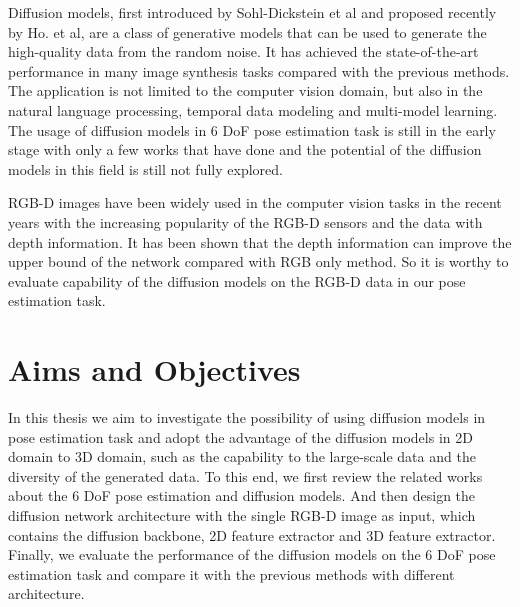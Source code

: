 \documentclass[12pt,DIV14,BCOR12mm,a4paper,footinclude=false,headinclude,parskip=half-,twoside,openright,cleardoublepage=empty,toc=index,bibliography=totoc,listof=totoc]{scrreprt}
\numberwithin{equation}{chapter}
\begin{document}
Diffusion models, first introduced by Sohl-Dickstein et al\cite{sohldickstein2015deep} and proposed recently by Ho. et al\cite{ho2020denoising}, are a class of generative models that can be used to generate the high-quality data from the random noise. It has achieved the state-of-the-art performance in many image synthesis tasks compared with the previous methods. The application is not limited to the computer vision domain, but also in the natural language processing, temporal data modeling and multi-model learning. The usage of diffusion models in 6 DoF pose estimation task is still in the early stage with only a few works that have done and the potential of the diffusion models in this field is still not fully explored.

RGB-D images have been widely used in the computer vision tasks in the recent years with the increasing popularity of the RGB-D sensors and the data with depth information. It has been shown that the depth information can improve the upper bound of the network compared with RGB only method. So it is worthy to evaluate capability of the diffusion models on the RGB-D data in our pose estimation task.
\section{Aims and Objectives}
In this thesis we aim to investigate the possibility of using diffusion models in pose estimation task and adopt the advantage of the diffusion models in 2D domain to 3D domain, such as the capability to the large-scale data and the diversity of the generated data. To this end, we first review the related works about the 6 DoF pose estimation and diffusion models. And then design the diffusion network architecture with the single RGB-D image as input, which contains the diffusion backbone, 2D feature extractor and 3D feature extractor. Finally, we evaluate the performance of the diffusion models on the 6 DoF pose estimation task and compare it with the previous methods with different architecture.
\end{document}
